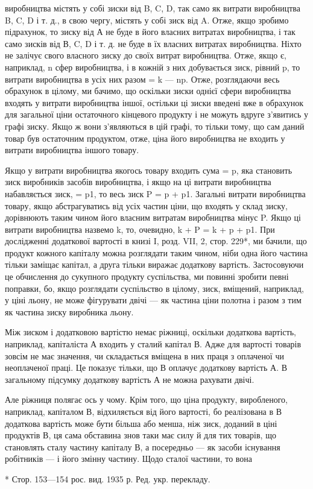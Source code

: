 виробництва містять у собі зиски від B, C, D, так само як витрати виробництва B, C, D і т. д., в
свою чергу, містять у собі
зиск від A. Отже, якщо зробимо підрахунок, то зиску від А не
буде в його власних витратах виробництва, і так само зисків
від В, C, D і т. д. не буде в їх власних витратах виробництва.
Ніхто не залічує свого власного зиску до своїх витрат виробництва. Отже, якщо є, наприклад, n сфер
виробництва, і в кожній з них добувається зиск, рівний p, то витрати виробництва в усіх них разом =
k — np. Отже, розглядаючи весь обрахунок
в цілому, ми бачимо, що оскільки зиски однієї сфери виробництва входять у витрати виробництва іншої,
остільки ці зиски
введені вже в обрахунок для загальної ціни остаточного кінцевого
продукту і не можуть вдруге з’явитись у графі зиску. Якщо ж
вони з’являються в цій графі, то тільки тому, що сам даний
товар був остаточним продуктом, отже, ціна його виробництва
не входить у витрати виробництва іншого товару.

Якщо у витрати виробництва якогось товару входить сума = p, яка становить зиск виробників засобів
виробництва, і якщо
на ці витрати виробництва набавляється зиск, = p1, то весь зиск
P = p + p1. Загальні витрати виробництва товару, якщо абстрагуватись від усіх частин ціни, що
входять у склад зиску, дорівнюють таким чином його власним витратам виробництва мінус P.
Якщо ці витрати виробництва назвемо k, то, очевидно, k + P = k + p + p1. При дослідженні додаткової
вартості в книзі I,
розд. VII, 2, стор. 229*, ми бачили, що продукт кожного капіталу можна розглядати таким чином, ніби
одна його частина
тільки заміщає капітал, а друга тільки виражає додаткову вартість. Застосовуючи це обчислення до
сукупного продукту
суспільства, ми повинні зробити певні поправки, бо, якщо
розглядати суспільство в цілому, зиск, вміщений, наприклад,
у ціні льону, не може фігурувати двічі — як частина ціни полотна
і разом з тим як частина зиску виробника льону.

Між зиском і додатковою вартістю немає ріжниці, оскільки
додаткова вартість, наприклад, капіталіста А входить у сталий
капітал В. Адже для вартості товарів зовсім не має значення, чи
складається вміщена в них праця з оплаченої чи неоплаченої праці.
Це показує тільки, що В оплачує додаткову вартість А. В загальному підсумку додаткову вартість А не
можна рахувати двічі.

Але ріжниця полягає ось у чому. Крім того, що ціна продукту,
виробленого, наприклад, капіталом В, відхиляється від його вартості, бо реалізована в В додаткова
вартість може бути більша
або менша, ніж зиск, доданий в ціні продуктів В, ця сама обставина
знов таки має силу й для тих товарів, що становлять сталу
частину капіталу В, а посередньо — як засоби існування робітників — і його змінну частину. Щодо
сталої частини, то вона

* Стор. 153—154 рос. вид. 1935 р. Ред. укр. перекладу.
